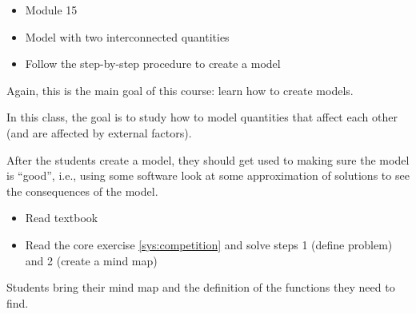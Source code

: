 \begin{lesson}

	\begin{itemize}
		\item Module 15
	\end{itemize}

	\begin{itemize}
		\item Model with two interconnected quantities
		\item Follow the step-by-step procedure to create a model
	\end{itemize}
	

Again, this is the main goal of this course: learn how to create models.

In this class, the goal is to study how to model quantities that affect each other (and are affected by external factors). 

After the students create a model, they should get used to making sure the model is ``good'', i.e., using some software look at some approximation of solutions to see the consequences of the model.



\begin{itemize}
	\item Read textbook
	\item Read the core exercise \ref{sys:competition} and solve steps 1 (define problem) and 2 (create a mind map)
\end{itemize}


\end{lesson}



\begin{annotation}
\begin{goals}
	Students bring their mind map and the definition of the functions they need to find.
\end{goals}	
\end{annotation}

